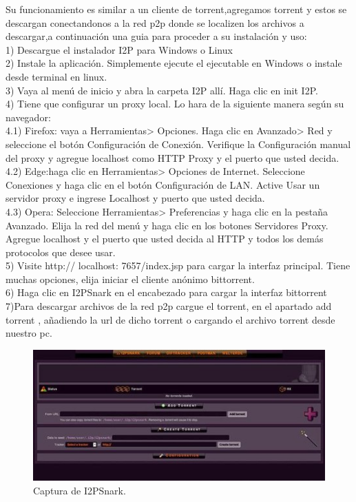 \documentclass{article}
\begin{document}
Su funcionamiento es similar a un cliente de torrent,agregamos torrent y estos se descargan conectandonos a la red p2p donde se localizen los archivos a descargar,a continuación 
una guia para proceder a su instalación y uso:
\\

1) Descargue el instalador I2P para Windows o Linux
\\

2) Instale la aplicación. Simplemente ejecute el ejecutable en Windows o instale desde terminal en linux.
\\

3) Vaya al menú de inicio y abra la carpeta I2P allí. Haga clic en init I2P.
\\

4) Tiene que configurar un proxy local. Lo hara de la siguiente manera según su navegador:
\\

4.1) Firefox: vaya a Herramientas> Opciones. Haga clic en Avanzado> Red y seleccione el botón Configuración de Conexión. Verifique la Configuración manual del proxy y agregue localhost como HTTP Proxy y el puerto que usted decida.
\\

4.2) Edge:haga clic en Herramientas> Opciones de Internet. Seleccione Conexiones  y haga clic en el botón Configuración de LAN. Active Usar un servidor proxy e ingrese Localhost y puerto que usted decida.
\\

4.3) Opera: Seleccione Herramientas> Preferencias y haga clic en la pestaña Avanzado. Elija la red del menú y haga clic en los botones Servidores Proxy. Agregue localhost y el puerto que usted decida al HTTP y todos los demás protocolos que desee usar.
\\

5) Visite http:// localhost: 7657/index.jsp para cargar la interfaz principal. Tiene muchas opciones, elija iniciar el cliente anónimo bittorrent.
\\

6) Haga clic en I2PSnark en el encabezado para cargar la interfaz bittorrent
\\

7)Para descargar archivos de la red p2p  cargue el torrent, en el apartado add torrent , añadiendo la url de dicho torrent o cargando el archivo torrent desde nuestro pc.
\\

\begin{figure}
    \includegraphics[]{media/i2p_3.jpg}
    \caption{Captura de I2PSnark.}
    \label{fig4}
\end{figure}
\end{document}
